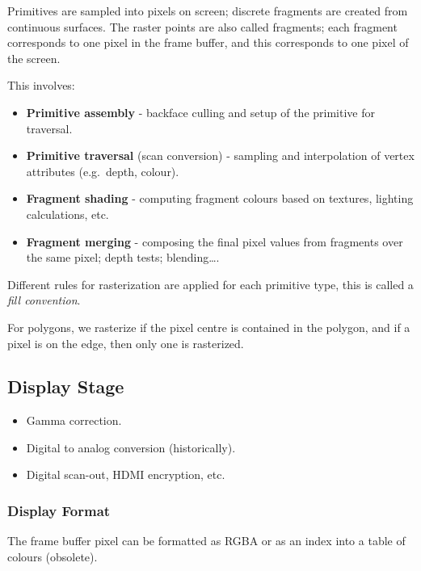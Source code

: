 \documentclass[11pt]{article}
\begin{document}
Primitives are sampled into pixels on screen; discrete fragments are created from continuous surfaces.
The raster points are also called fragments; each fragment corresponds to one pixel in the frame buffer, and this corresponds to one pixel of the screen.

This involves:
\begin{itemize}
  \item \textbf{Primitive assembly} - backface culling and setup of the primitive for traversal.
  \item \textbf{Primitive traversal} (scan conversion) - sampling and interpolation of vertex attributes (e.g.\ depth, colour).
  \item \textbf{Fragment shading} - computing fragment colours based on textures, lighting calculations, etc.
  \item \textbf{Fragment merging} - composing the final pixel values from fragments over the same pixel; depth tests; blending\dots.
\end{itemize}

Different rules for rasterization are applied for each primitive type, this is called a \textit{fill convention}.

For polygons, we rasterize if the pixel centre is contained in the polygon, and if a pixel is on the edge, then only one is rasterized.

\subsection{Display Stage}
\begin{itemize}
  \item Gamma correction.
  \item Digital to analog conversion (historically).
  \item Digital scan-out, HDMI encryption, etc.
\end{itemize}

\subsubsection{Display Format}
The frame buffer pixel can be formatted as RGBA or as an index into a table of colours (obsolete).
\end{document}
